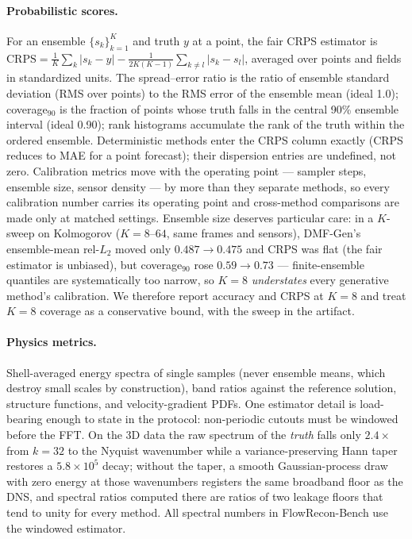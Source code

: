 \documentclass[aip,pof,reprint,amsmath,amssymb,superscriptaddress]{revtex4-1}
\newcommand{\dmfgen}{DMF-Gen}
\newcommand{\benchname}{FlowRecon-Bench}
\begin{document}
\paragraph{Probabilistic scores.} For an ensemble $\{s_k\}_{k=1}^{K}$ and
truth $y$ at a point, the fair CRPS estimator\cite{gneiting2007strictly} is
$\mathrm{CRPS}=\frac{1}{K}\sum_k |s_k-y| -
\frac{1}{2K(K-1)}\sum_{k\ne l}|s_k-s_l|$, averaged over points and fields in
standardized units. The spread--error ratio is the ratio of ensemble standard
deviation (RMS over points) to the RMS error of the ensemble mean (ideal 1.0);
coverage$_{90}$ is the fraction of points whose truth falls in the central
90\% ensemble interval (ideal 0.90); rank histograms accumulate the rank of
the truth within the ordered ensemble. Deterministic methods enter the CRPS
column exactly (CRPS reduces to MAE for a point forecast); their dispersion
entries are undefined, not zero. Calibration metrics move with the operating
point --- sampler steps, ensemble size, sensor density --- by more than they
separate methods, so every calibration number carries its operating point and
cross-method comparisons are made only at matched settings. Ensemble size
deserves particular care: in a $K$-sweep on Kolmogorov ($K{=}8$--$64$, same
frames and sensors), \dmfgen{}'s ensemble-mean rel-$L_2$ moved only
$0.487{\to}0.475$ and CRPS was flat (the fair estimator is unbiased), but
coverage$_{90}$ rose $0.59{\to}0.73$ --- finite-ensemble quantiles are
systematically too narrow, so $K{=}8$ \emph{understates} every generative
method's calibration. We therefore report accuracy and CRPS at $K{=}8$ and
treat $K{=}8$ coverage as a conservative bound, with the sweep in the
artifact.

\paragraph{Physics metrics.} Shell-averaged energy spectra of single samples
(never ensemble means, which destroy small scales by construction), band
ratios against the reference solution, structure functions, and
velocity-gradient PDFs. One estimator detail is load-bearing enough to state
in the protocol: non-periodic cutouts must be windowed before the FFT. On the
3D data the raw spectrum of the \emph{truth} falls only $2.4\times$ from
$k=32$ to the Nyquist wavenumber while a variance-preserving Hann taper
restores a $5.8\times10^{5}$ decay; without the taper, a smooth
Gaussian-process draw with zero energy at those wavenumbers registers the
same broadband floor as the DNS, and spectral ratios computed there are
ratios of two leakage floors that tend to unity for every method. All
spectral numbers in \benchname{} use the windowed estimator.
\end{document}
